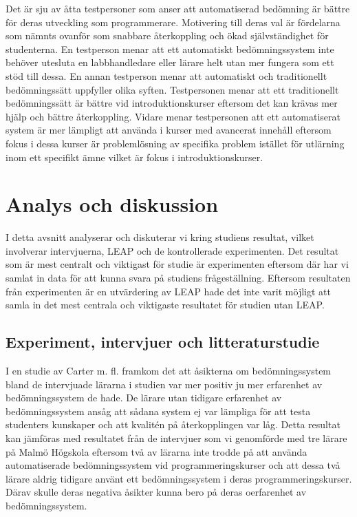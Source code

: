 \documentclass[a4paper,11pt]{article}
\begin{document}
{Det är sju av åtta testpersoner som anser att automatiserad bedömning är bättre för deras utveckling som programmerare. Motivering till deras val är fördelarna som nämnts ovanför som snabbare återkoppling och ökad självständighet för studenterna. En testperson menar att ett automatiskt bedömningssystem inte behöver utesluta en labbhandledare eller lärare helt utan mer fungera som ett stöd till dessa. En annan testperson menar att automatiskt och traditionellt bedömningssätt uppfyller olika syften. Testpersonen menar att ett traditionellt bedömningssätt är bättre vid introduktionskurser eftersom det kan krävas mer hjälp och bättre återkoppling. Vidare menar testpersonen att ett automatiserat system är mer lämpligt att använda i kurser med avancerat innehåll eftersom fokus i dessa kurser är problemlösning av specifika problem istället för utlärning inom ett specifikt ämne vilket är fokus i introduktionskurser.

\newpage
\section{Analys och diskussion}

I detta avsnitt analyserar och diskuterar vi kring studiens resultat, vilket involverar intervjuerna, LEAP och de kontrollerade experimenten. Det resultat som är mest centralt och viktigast för studie är experimenten eftersom där har vi samlat in data för att kunna svara på studiens frågeställning. Eftersom resultaten från experimenten är en utvärdering av LEAP hade det inte varit möjligt att samla in det mest centrala och viktigaste resultatet för studien utan LEAP.

\subsection{Experiment, intervjuer och litteraturstudie}

I en studie av Carter m. fl. \cite{carter} framkom det att åsikterna om bedömningssystem bland de intervjuade lärarna i studien var mer positiv ju mer erfarenhet av bedömningssystem de hade. De lärare utan tidigare erfarenhet av bedömningssystem ansåg att sådana system ej var lämpliga för att testa studenters kunskaper och att kvalitén på återkopplingen var låg. Detta resultat kan jämföras med resultatet från de intervjuer som vi genomförde med tre lärare på Malmö Högskola eftersom två av lärarna inte trodde på att använda automatiserade bedömningssystem vid programmeringskurser och att dessa två lärare aldrig tidigare använt ett bedömningssystem i deras programmeringskurser. Därav skulle deras negativa åsikter kunna bero på deras oerfarenhet av bedömningssystem.

}
\end{document}
